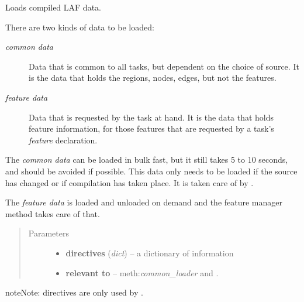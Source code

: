 \documentclass[letterpaper,10pt,english]{sphinxmanual}
\begin{document}
\begin{fulllineitems}

\begin{fulllineitems}
\label{graf/graf:graf.GrafTask.loader}
Loads compiled LAF data.

There are two kinds of data to be loaded:
\begin{description}
\item[{\emph{common data}}] \leavevmode
Data that is common to all tasks, but dependent on the choice of source.
It is the data that holds the regions, nodes, edges, but not the features.

\item[{\emph{feature data}}] \leavevmode
Data that is requested by the task at hand.
It is the data that holds feature information,
for those features that are requested by a task's \emph{feature} declaration.

\end{description}

The \emph{common data} can be loaded in bulk fast, but it still takes 5 to 10 seconds,
and should be avoided if possible.
This data only needs to be loaded if the source has changed or if compilation has taken place.
It is taken care of by {\hyperref[graf/graf:graf.GrafTask.common_loader]{}}.

The \emph{feature data} is loaded and unloaded on demand
and the feature manager method {\hyperref[graf/graf:graf.GrafTask.feature_loader]{}} takes care of that.
\begin{quote}\begin{description}
\item[{Parameters}] \leavevmode\begin{itemize}
\item {} 
\textbf{directives} (\emph{dict}) --
a dictionary of information

\item {} 
\textbf{relevant to} --
meth:\emph{common\_loader} and {\hyperref[graf/graf:graf.GrafTask.feature_loader]{}}.

\end{itemize}

\end{description}\end{quote}

\begin{notice}{note}{Note:}
directives are only used by {\hyperref[graf/graf:graf.GrafTask.feature_loader]{}}.
\end{notice}


\end{fulllineitems}
\end{fulllineitems}
\end{document}
